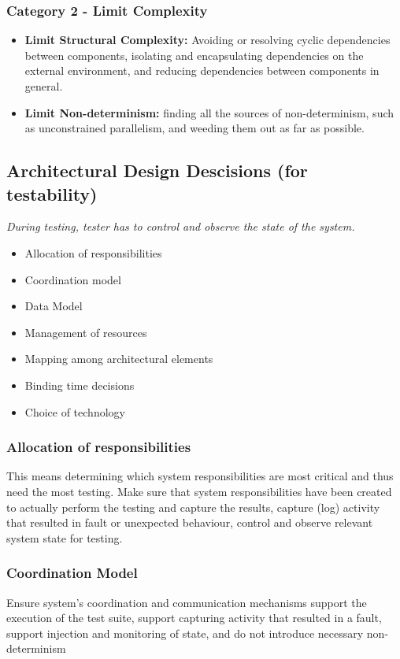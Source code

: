 \documentclass[a4paper]{article}
\begin{document}
\subsubsection{Category 2 - Limit Complexity}
\begin{itemize}
  \item \textbf{Limit Structural Complexity:}  Avoiding or
resolving cyclic dependencies between
components, isolating and encapsulating
dependencies on the external environment,
and reducing dependencies between
components in general.
\item \textbf{Limit Non-determinism:} finding all the sources
of non-determinism, such as unconstrained
parallelism, and weeding them out as far as
possible.
\end{itemize}

\subsection{Architectural Design Descisions (for testability)}
\textit{During testing, tester has to control and observe the state of the system.}
\begin{itemize}
\item{Allocation of responsibilities}
\item{Coordination model}
\item{Data Model}
\item{Management of resources}
\item{Mapping among architectural elements}
\item{Binding time decisions}
\item{Choice of technology}
\end{itemize}

\subsubsection{Allocation of responsibilities}
This means determining which system responsibilities are most critical and thus need the most testing.
Make sure that system responsibilities have been created to actually perform the testing and capture the results, capture (log) activity that resulted in fault or unexpected behaviour, control and observe relevant system state for testing.

\subsubsection{Coordination Model}
Ensure system's coordination and communication mechanisms support the execution of the test suite, support capturing activity that resulted in a fault, support injection and monitoring of state, and do not introduce necessary non-determinism
\end{document}
